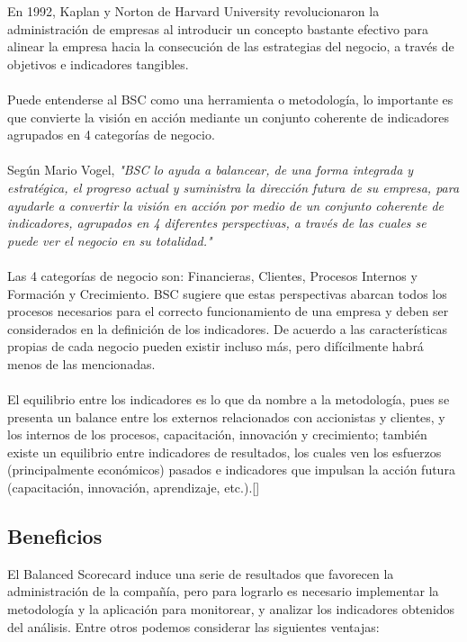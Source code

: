 \documentclass[10pt,a4paper]{article}
\begin{document}
		En 1992, Kaplan y Norton de Harvard University revolucionaron la administración de empresas al introducir un concepto bastante efectivo para alinear la empresa hacia la consecución de las estrategias del negocio, a través de objetivos e indicadores tangibles.\\
		\\		
		Puede entenderse al BSC como una herramienta o metodología, lo importante es que convierte la visión en acción mediante un conjunto coherente de indicadores agrupados en 4 categorías de negocio.\\
		\\
		Según Mario Vogel, \textit{"BSC lo ayuda a balancear, de una forma integrada y estratégica, el progreso actual y suministra la dirección futura de su empresa, para ayudarle a convertir la visión en acción por medio de un conjunto coherente de indicadores, agrupados en 4 diferentes perspectivas, a través de las cuales se puede ver el negocio en su totalidad."}\\
		\\
		Las 4 categorías de negocio son: Financieras, Clientes, Procesos Internos y Formación y Crecimiento. BSC sugiere que estas perspectivas abarcan todos los procesos necesarios para el correcto funcionamiento de una empresa y deben ser considerados en la definición de los indicadores. De acuerdo a las características propias de cada negocio pueden existir incluso más, pero difícilmente habrá menos de las mencionadas.\\
		\\
		El equilibrio entre los indicadores es lo que da nombre a la metodología, pues se presenta un balance entre los externos relacionados con accionistas y clientes, y los internos de los procesos, capacitación, innovación y crecimiento; también existe un equilibrio entre indicadores de resultados, los cuales ven los esfuerzos (principalmente económicos) pasados e indicadores que impulsan la acción futura (capacitación, innovación, aprendizaje, etc.).[\cite{herrera2015modelo}]
		
			\subsection{Beneficios}
			
			El Balanced Scorecard induce una serie de resultados que favorecen la administración de la compañía, pero para lograrlo es necesario implementar la metodología y la aplicación para monitorear, y analizar los indicadores obtenidos del análisis. Entre otros podemos considerar las siguientes ventajas:
			
\end{document}
